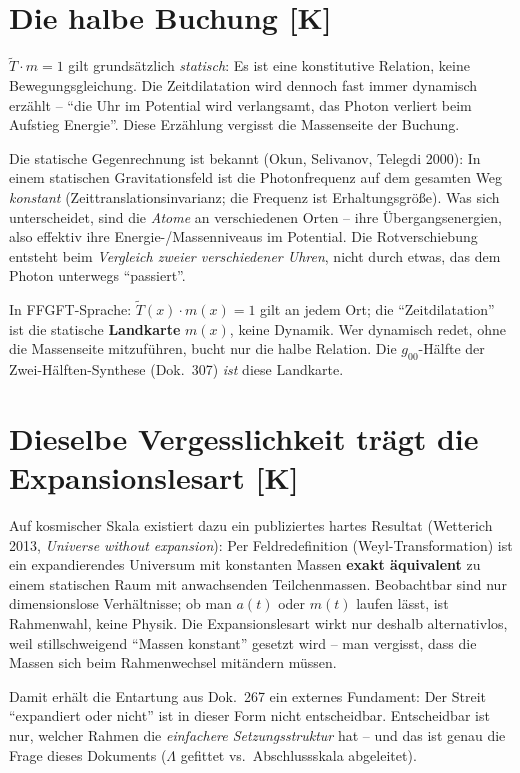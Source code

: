 \documentclass[11pt]{report}
\begin{document}
\section{Die halbe Buchung [K]}

$\tilde T \cdot m = 1$ gilt grundsätzlich \emph{statisch}: Es ist
eine konstitutive Relation, keine Bewegungsgleichung. Die
Zeitdilatation wird dennoch fast immer dynamisch erzählt --
\enquote{die Uhr im Potential wird verlangsamt, das Photon verliert
beim Aufstieg Energie}. Diese Erzählung vergisst die Massenseite
der Buchung.

Die statische Gegenrechnung ist bekannt (Okun, Selivanov, Telegdi
2000): In einem statischen Gravitationsfeld ist die Photonfrequenz
auf dem gesamten Weg \emph{konstant} (Zeittranslationsinvarianz;
die Frequenz ist Erhaltungsgröße). Was sich unterscheidet, sind die
\emph{Atome} an verschiedenen Orten -- ihre Übergangsenergien, also
effektiv ihre Energie-/Massenniveaus im Potential. Die
Rotverschiebung entsteht beim \emph{Vergleich zweier verschiedener
Uhren}, nicht durch etwas, das dem Photon unterwegs
\enquote{passiert}.

In FFGFT-Sprache: $\tilde T(x)\cdot m(x) = 1$ gilt an jedem Ort;
die \enquote{Zeitdilatation} ist die statische \textbf{Landkarte}
$m(x)$, keine Dynamik. Wer dynamisch redet, ohne die Massenseite
mitzuführen, bucht nur die halbe Relation. Die $g_{00}$-Hälfte der
Zwei-Hälften-Synthese (Dok.~307) \emph{ist} diese Landkarte.

\section{Dieselbe Vergesslichkeit trägt die Expansionslesart [K]}

Auf kosmischer Skala existiert dazu ein publiziertes hartes
Resultat (Wetterich 2013, \emph{Universe without expansion}): Per
Feldredefinition (Weyl-Transformation) ist ein expandierendes
Universum mit konstanten Massen \textbf{exakt äquivalent} zu einem
statischen Raum mit anwachsenden Teilchenmassen. Beobachtbar sind
nur dimensionslose Verhältnisse; ob man $a(t)$ oder $m(t)$ laufen
lässt, ist Rahmenwahl, keine Physik. Die Expansionslesart wirkt nur
deshalb alternativlos, weil stillschweigend \enquote{Massen
konstant} gesetzt wird -- man vergisst, dass die Massen sich beim
Rahmenwechsel mitändern müssen.

Damit erhält die Entartung aus Dok.~267 ein externes Fundament:
Der Streit \enquote{expandiert oder nicht} ist in dieser Form nicht
entscheidbar. Entscheidbar ist nur, welcher Rahmen die
\emph{einfachere Setzungsstruktur} hat -- und das ist genau die
Frage dieses Dokuments ($\Lambda$ gefittet vs.\ Abschlussskala
abgeleitet).
\end{document}

